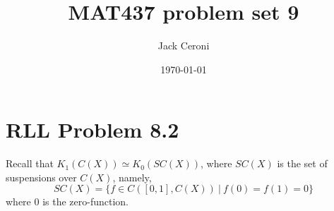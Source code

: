 \documentclass[aps,pra,showpacs,notitlepage,onecolumn,superscriptaddress,nofootinbib]{revtex4-1}
\theoremstyle{definition}
\newcommand{\hhrulefill}{\hspace{-1.5em} \hrulefill}
\begin{document}
\title{MAT437 problem set 9}
\author{Jack Ceroni}

\date{\today}

\maketitle

\hhrulefill

\section{RLL Problem 8.2}

\noindent  Recall that $K_1(C(X)) \simeq K_0(SC(X))$, where $SC(X)$ is the set of suspensions over $C(X)$, namely,
\begin{equation}
  SC(X) = \{f \in C([0, 1], C(X)) \ | \ f(0) = f(1) = 0\}
\end{equation}
where $0$ is the zero-function.
\end{document}
